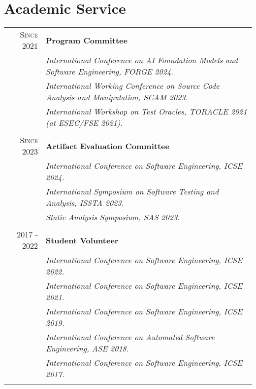 \documentclass[a4paper,10pt]{article} %
\begin{document}
\section{Academic Service}
\begin{longtable}{rl}

\textsc{Since 2021}   & \textbf{Program Committee} \\
& \textit{International Conference on AI Foundation Models and Software Engineering, FORGE 2024.} \\
& \textit{International Working Conference on Source Code Analysis and Manipulation, SCAM 2023.} \\ 
& \textit{International Workshop on Test Oracles, TORACLE 2021 (at ESEC/FSE 2021).} \\ & \\

\textsc{Since 2023} & \textbf{Artifact Evaluation Committee} \\
& \textit{International Conference on Software Engineering, ICSE 2024.} \\
& \textit{International Symposium on Software Testing and Analysis, ISSTA 2023.} \\ 
& \textit{Static Analysis Symposium, SAS 2023.} \\ & \\

\textsc{2017 - 2022} & \textbf{Student Volunteer} \\
& \textit{International Conference on Software Engineering, ICSE 2022.} \\
& \textit{International Conference on Software Engineering, ICSE 2021.} \\
& \textit{International Conference on Software Engineering, ICSE 2019.} \\
& \textit{International Conference on Automated Software Engineering, ASE 2018.} \\
& \textit{International Conference on Software Engineering, ICSE 2017.} \\ & \\

\end{longtable}
\end{document}
